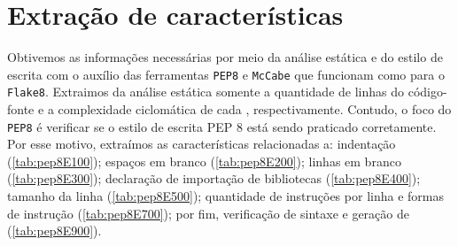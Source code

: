 	\section{Extração de características}
		Obtivemos as informações necessárias por meio da análise estática e do estilo de
		escrita com o auxílio das ferramentas \texttt{PEP8} \cite{pep8} e \texttt{McCabe}
		\cite{mccabe} que funcionam como  para o \texttt{Flake8}.
		Extraimos da análise estática somente a quantidade de linhas do código-fonte e a
		complexidade ciclomática de cada , respectivamente. Contudo, o
		foco do \texttt{PEP8} é verificar se o estilo de escrita PEP 8 \cite{van2001pep}
		está sendo praticado corretamente. Por esse motivo, extraímos as características
		relacionadas a: indentação (\cref{tab:pep8E100}); espaços em branco
		(\cref{tab:pep8E200}); linhas em branco (\cref{tab:pep8E300}); declaração de
		importação de bibliotecas (\cref{tab:pep8E400}); tamanho da linha (\cref{tab:pep8E500});
		quantidade de instruções por linha e formas de instrução (\cref{tab:pep8E700}); por fim,
		verificação de sintaxe e geração de  (\cref{tab:pep8E900}).
	
